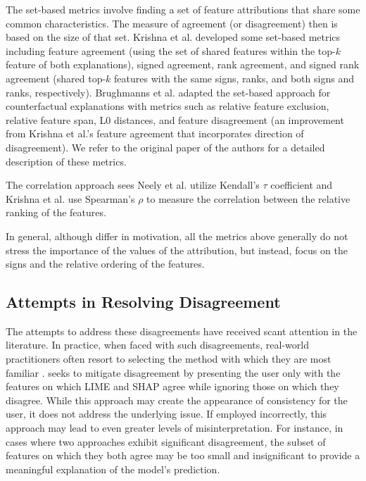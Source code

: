 The set-based metrics involve finding a set of feature attributions that share some common characteristics. The measure of agreement (or disagreement) then is based on the size of that set. Krishna et al. \cite{krishna_disagreement_problem} developed some set-based metrics including feature agreement (using the set of shared features within the top-$k$ feature of both explanations), signed agreement, rank agreement, and signed rank agreement (shared top-$k$ features with the same signs, ranks, and both signs and ranks, respectively). Brughmanns et al. \cite{disagreementCounterfactual} adapted the set-based approach for counterfactual explanations with metrics such as relative feature exclusion, relative feature span, L0 distances, and feature disagreement (an improvement from Krishna et al.'s feature agreement that incorporates direction of disagreement). We refer to the original paper of the authors for a detailed description of these metrics.

The correlation approach sees Neely et al. \cite{proneToDisagreement} utilize Kendall's $\tau$ coefficient and Krishna et al. use Spearman's $\rho$ to measure the correlation between the relative ranking of the features.

In general, although differ in motivation, all the metrics above generally do not stress the importance of the values of the attribution, but instead, focus on the signs and the relative ordering of the features.

\subsection{Attempts in Resolving Disagreement}
\label{subsec:attemptsInResolvingDisagreement}
The attempts to address these disagreements have received scant attention in the literature. In practice, when faced with such disagreements, real-world practitioners often resort to selecting the method with which they are most familiar \cite{krishna_disagreement_problem}. \cite{whyDontXAITechniquesAgree} seeks to mitigate disagreement by presenting the user only with the features on which LIME and SHAP agree while ignoring those on which they disagree. While this approach may create the appearance of consistency for the user, it does not address the underlying issue. If employed incorrectly, this approach may lead to even greater levels of misinterpretation. For instance, in cases where two approaches exhibit significant disagreement, the subset of features on which they both agree may be too small and insignificant to provide a meaningful explanation of the model's prediction.